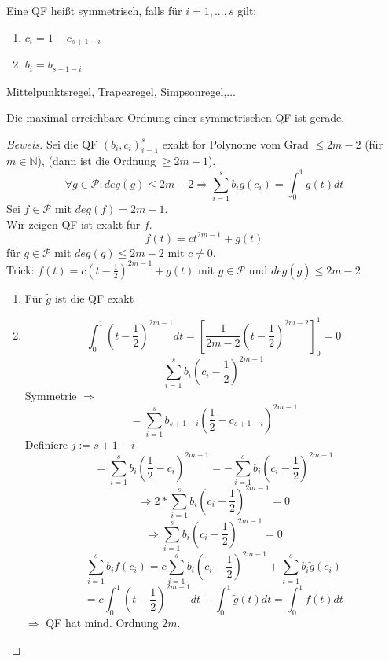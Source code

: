\begin{definition}
Eine QF heißt symmetrisch, falls für $i = 1,...,s$ gilt:
\begin{enumerate}
  \item $c_i = 1 - c_{s+1-i}$
  \item $b_i = b_{s+1-i}$
\end{enumerate}
\end{definition}

\begin{example}[Symmetrische QF]
Mittelpunktsregel, Trapezregel, Simpsonregel,...
\end{example}

\begin{theorem}
Die maximal erreichbare Ordnung einer symmetrischen QF ist gerade.
\begin{proof}[Beweis]
Sei die QF $(b_i,c_i)_{i=1}^{s}$ exakt for Polynome vom Grad $\leq 2m-2$ (für $m \in \mathbb{N}$), (dann ist die Ordnung $\geq 2m-1$).
$$\forall g \in \mathcal{P}: deg(g) \leq 2m-2 \Rightarrow \sum_{i=1}^{s} b_i g(c_i) = \int_{0}^{1} g(t) dt$$
Sei $f \in \mathcal{P}$ mit $deg(f) = 2m-1$. \\
Wir zeigen QF ist exakt für $f$. 
$$f(t) = ct^{2m-1} + g(t)$$
für $g \in \mathcal{P}$ mit $deg(g) \leq 2m-2$ mit $c \neq 0$. \\
Trick: $f(t) = c(t-\frac{1}{2})^{2m-1} + \tilde{g}(t)$ mit $\tilde{g} \in \mathcal{P}$ und $deg(\tilde{g}) \leq 2m-2$

\begin{enumerate}
  \item Für $\tilde{g}$ ist die QF exakt
  \item $$\int_0^1 \left(t-\frac{1}{2}\right)^{2m-1} dt = \left[\frac{1}{2m-2}\left(t-\frac{1}{2}\right)^{2m-2}\right]_0^1 = 0$$
  $$ \sum_{i=1}^{s} b_i \left(c_i - \frac{1}{2}\right)^{2m-1}$$ 
  Symmetrie $\Rightarrow$
  $$= \sum_{i=1}^{s} b_{s+1-i} \left(\frac{1}{2} - c_{s+1-i}\right)^{2m-1} $$
  Definiere $j := s+1-i$
  $$ = \sum_{i=1}^{s} b_i \left(\frac{1}{2} - c_i\right)^{2m-1} = -\sum_{i=1}^{s} b_i \left(c_i - \frac{1}{2}\right)^{2m-1}$$
  $$\Rightarrow 2*\sum_{i=1}^{s} b_i \left(c_i - \frac{1}{2}\right)^{2m-1} = 0$$
  $$\Rightarrow \sum_{i=1}^{s} b_i \left(c_i - \frac{1}{2}\right)^{2m-1} = 0$$
  $$\sum_{i=1}^{s}b_if(c_i) = c \sum_{i=1}^{s}b_i\left(c_i-\frac{1}{2}\right)^{2m-1} + \sum_{i=1}^{s}b_i\tilde{g}(c_i)$$
  $$ = c\int_0^1\left(t-\frac{1}{2}\right)^{2m-1} dt + \int_0^1 \tilde{g}(t)dt = \int_0^1 f(t)dt$$
  $\Rightarrow$ QF hat mind. Ordnung $2m$.
\end{enumerate}
\end{proof}
\end{theorem}

